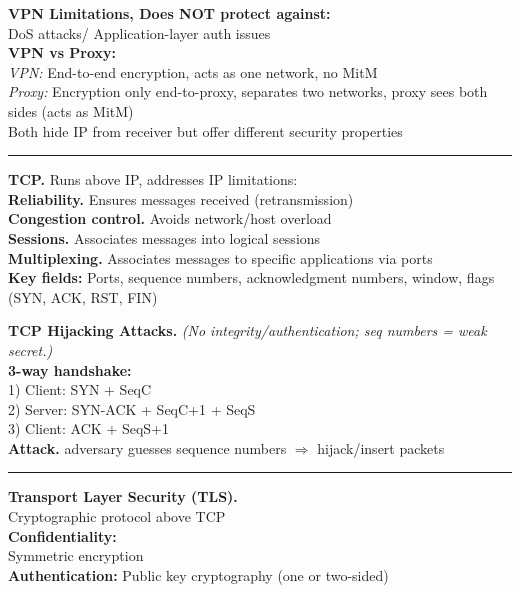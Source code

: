 \documentclass[9pt, a4paper]{extarticle}
\makeatletter
\renewcommand{\hline}{\noalign{\vskip 2px}\hrule\@height\arrayrulewidth\@width\linewidth\noalign{\vskip 2px}}
\makeatother
\begin{document}
\begin{minipage}[t]{0.495\textwidth}
	\begin{minipage}[t]{0.495\textwidth}
		\textbf{VPN Limitations, Does NOT protect against:}\\
		DoS attacks/ Application-layer auth issues\\
		\textbf{VPN vs Proxy:}\\
		\textit{VPN:} End-to-end encryption, acts as one network, no MitM\\
		\textit{Proxy:} Encryption only end-to-proxy, separates two networks, proxy sees both sides (acts as MitM)\\
		Both hide IP from receiver but offer different security properties
	\end{minipage}\hline
	\begin{minipage}[t]{0.56\textwidth}
		\textbf{TCP.}
		Runs above IP, addresses IP limitations:\\
		\textbf{Reliability.} Ensures messages received (retransmission)\\
		\textbf{Congestion control.} Avoids network/host overload\\
		\textbf{Sessions.} Associates messages into logical sessions\\
		\textbf{Multiplexing.} Associates messages to specific applications via ports\\
		\textbf{Key fields:} Ports, sequence numbers, acknowledgment numbers, window, flags (SYN, ACK, RST, FIN)
	\end{minipage}\hfill\vline\hfill
	\begin{minipage}[t]{0.43\textwidth}
		\textbf{TCP Hijacking Attacks.} \textit{(No integrity/authentication; seq numbers = weak secret.)}\\
		\textbf{3-way handshake:}\\
		1) Client: SYN + SeqC\\
		2) Server: SYN-ACK + SeqC+1 + SeqS\\
		3) Client: ACK + SeqS+1\\
		\textbf{Attack.} adversary guesses sequence numbers $\Rightarrow$ hijack/insert packets
	\end{minipage}\hline
	\begin{minipage}[t]{0.36\textwidth}
		\textbf{Transport Layer Security (TLS).}\\
		Cryptographic protocol above TCP \\
		\textbf{Confidentiality:} \\Symmetric encryption\\
		\textbf{Authentication:} Public key cryptography (one or two-sided)\\

\end{minipage}
\end{minipage}
\end{document}
